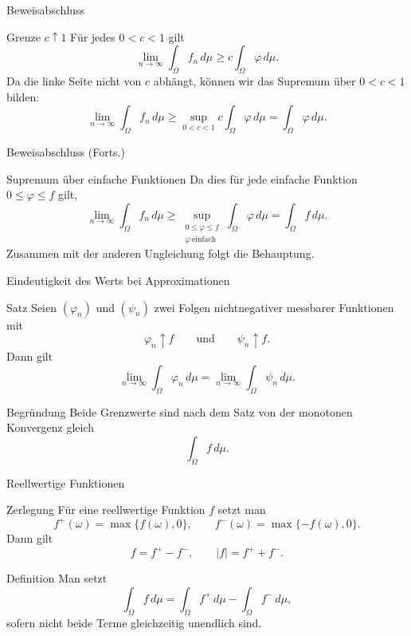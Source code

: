 \documentclass{beamer}
\begin{document}
\begin{frame}{Beweisabschluss}
\begin{block}{Grenze \(c\uparrow 1\)}
Für jedes \(0<c<1\) gilt
\[
\lim_{n\to\infty}\int_\Omega f_n\,d\mu
\ge
c\int_\Omega \varphi\,d\mu.
\]
Da die linke Seite nicht von \(c\) abhängt, können wir das Supremum über \(0<c<1\) bilden:
\[
\lim_{n\to\infty}\int_\Omega f_n\,d\mu
\ge
\sup_{0<c<1} c\int_\Omega \varphi\,d\mu
=
\int_\Omega \varphi\,d\mu.
\]
\end{block}
\end{frame}

\begin{frame}{Beweisabschluss (Forts.)}
\begin{block}{Supremum über einfache Funktionen}
Da dies für jede einfache Funktion \(0\le\varphi\le f\) gilt,
\[
\lim_{n\to\infty}\int_\Omega f_n\,d\mu
\ge
\sup_{\substack{0\le\varphi\le f\\ \varphi\ \text{einfach}}}
\int_\Omega \varphi\,d\mu
=
\int_\Omega f\,d\mu.
\]
Zusammen mit der anderen Ungleichung folgt die Behauptung.
\end{block}
\end{frame}


\begin{frame}{Eindeutigkeit des Werts bei Approximationen}
\begin{block}{Satz}
Seien \((\varphi_n)\) und \((\psi_n)\) zwei Folgen nichtnegativer messbarer Funktionen mit
\[
\varphi_n\uparrow f
\qquad\text{und}\qquad
\psi_n\uparrow f.
\]
Dann gilt
\[
\lim_{n\to\infty}\int_\Omega \varphi_n\,d\mu
=
\lim_{n\to\infty}\int_\Omega \psi_n\,d\mu.
\]
\end{block}

\begin{block}{Begründung}
Beide Grenzwerte sind nach dem Satz von der monotonen Konvergenz gleich
\[
\int_\Omega f\,d\mu.
\]
\end{block}
\end{frame}

\begin{frame}{Reellwertige Funktionen}
\begin{block}{Zerlegung}
Für eine reellwertige Funktion \(f\) setzt man
\[
f^+(\omega)=\max\{f(\omega),0\},
\qquad
f^-(\omega)=\max\{-f(\omega),0\}.
\]
Dann gilt
\[
f=f^+-f^-,
\qquad
|f|=f^++f^-.
\]
\end{block}

\begin{block}{Definition}
Man setzt
\[
\int_\Omega f\,d\mu
=
\int_\Omega f^+\,d\mu-\int_\Omega f^-\,d\mu,
\]
sofern nicht beide Terme gleichzeitig unendlich sind.
\end{block}
\end{frame}
\end{document}
